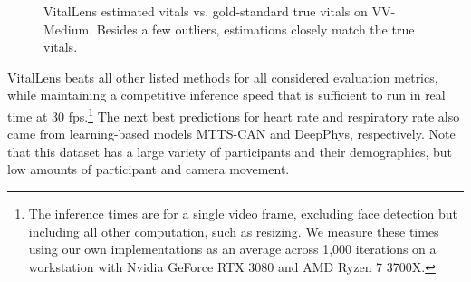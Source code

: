 \documentclass{article}
\begin{document}
\begin{figure}[h!]
  \centering
  \begin{subfigure}{0.48\textwidth}
  \end{subfigure}
  \hfill
  \begin{subfigure}{0.48\textwidth}
  \end{subfigure}
  \caption{VitalLens estimated vitals vs. gold-standard true vitals on VV-Medium. Besides a few outliers, estimations closely match the true vitals.}
  \label{fig:two_scatterplots}
\end{figure}

VitalLens beats all other listed methods for all considered evaluation metrics, while maintaining a competitive inference speed that is sufficient to run in real time at 30 fps.\footnote{The inference times are for a single video frame, excluding face detection but including all other computation, such as resizing. We measure these times using our own implementations as an average across 1,000 iterations on a workstation with Nvidia GeForce RTX 3080 and AMD Ryzen 7 3700X.}
The next best predictions for heart rate and respiratory rate also came from learning-based models MTTS-CAN and DeepPhys, respectively.
Note that this dataset has a large variety of participants and their demographics, but low amounts of participant and camera movement.
\end{document}
